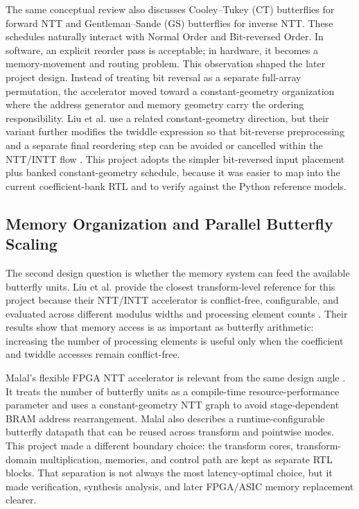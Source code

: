 \documentclass[a4paper, 12pt, titlepage]{article}
\begin{document}
The same conceptual review also discusses Cooley--Tukey (CT) butterflies for
forward NTT and Gentleman--Sande (GS) butterflies for inverse NTT. These
schedules naturally interact with Normal Order and Bit-reversed Order. In
software, an explicit reorder pass is acceptable; in hardware, it becomes a
memory-movement and routing problem. This observation shaped the later project
design. Instead of treating bit reversal as a separate full-array permutation,
the accelerator moved toward a constant-geometry organization where the
address generator and memory geometry carry the ordering responsibility.
Liu et al. use a related constant-geometry direction, but their variant further
modifies the twiddle expression so that bit-reverse preprocessing and a separate
final reordering step can be avoided or cancelled within the NTT/INTT flow
\cite{area-efficient}. This project adopts the simpler bit-reversed input
placement plus banked constant-geometry schedule, because it was easier to map
into the current coefficient-bank RTL and to verify against the Python
reference models.

\subsection{Memory Organization and Parallel Butterfly Scaling}

The second design question is whether the memory system can feed the available
butterfly units. Liu et al. provide the closest transform-level reference for
this project because their NTT/INTT accelerator is conflict-free,
configurable, and evaluated across different modulus widths and processing
element counts \cite{area-efficient}. Their results show that memory access is
as important as butterfly arithmetic: increasing the number of processing
elements is useful only when the coefficient and twiddle accesses remain
conflict-free.

Malal's flexible FPGA NTT accelerator is relevant from the same design angle
\cite{malal}. It treats the number of butterfly units as a compile-time
resource-performance parameter and uses a constant-geometry NTT graph to avoid
stage-dependent BRAM address rearrangement. Malal also describes a
runtime-configurable butterfly datapath that can be reused across transform and
pointwise modes. This project made a different boundary choice: the transform
cores, transform-domain multiplication, memories, and control path are kept as
separate RTL blocks. That separation is not always the most latency-optimal
choice, but it made verification, synthesis analysis, and later FPGA/ASIC memory
replacement clearer.
\end{document}
